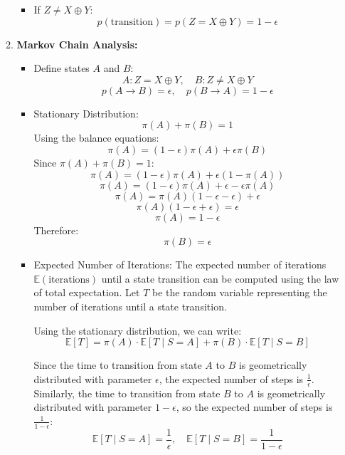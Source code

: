 \documentclass[a4 paper]{article}
\begin{document}
\begin{enumerate}
\begin{enumerate}
\begin{itemize}
            \item If \( Z \ne X \oplus Y \):
            \[
            p(\text{transition}) = p(Z = X \oplus Y) = 1 - \epsilon
            \]
        \end{itemize}
    
        \item \textbf{Markov Chain Analysis:}
        \begin{itemize}
            \item Define states \( A \) and \( B \):
            \[
            A: Z = X \oplus Y, \quad B: Z \ne X \oplus Y
            \]
            \[
            p(A \to B) = \epsilon, \quad p(B \to A) = 1 - \epsilon
            \]
    
            \item Stationary Distribution:
            \[
            \pi(A) + \pi(B) = 1
            \]
            Using the balance equations:
            \[
            \pi(A) = (1 - \epsilon) \pi(A) + \epsilon \pi(B)
            \]
            Since \(\pi(A) + \pi(B) = 1\):
            \[
            \pi(A) = (1 - \epsilon) \pi(A) + \epsilon (1 - \pi(A))
            \]
            \[
            \pi(A) = (1 - \epsilon) \pi(A) + \epsilon - \epsilon \pi(A)
            \]
            \[
            \pi(A) = \pi(A) (1 - \epsilon - \epsilon) + \epsilon
            \]
            \[
            \pi(A) (1 - \epsilon + \epsilon) = \epsilon
            \]
            \[
            \pi(A) = 1 - \epsilon
            \]
            Therefore:
            \[
            \pi(B) = \epsilon
            \]
    
            \item Expected Number of Iterations:
            The expected number of iterations \( \mathbb{E}(\text{iterations}) \) until a state transition can be computed using the law of total expectation. Let \( T \) be the random variable representing the number of iterations until a state transition.
            
            Using the stationary distribution, we can write:
            \[
            \mathbb{E}[T] = \pi(A) \cdot \mathbb{E}[T \mid S = A] + \pi(B) \cdot \mathbb{E}[T \mid S = B]
            \]
            
            Since the time to transition from state \( A \) to \( B \) is geometrically distributed with parameter \( \epsilon \), the expected number of steps is \( \frac{1}{\epsilon} \). Similarly, the time to transition from state \( B \) to \( A \) is geometrically distributed with parameter \( 1 - \epsilon \), so the expected number of steps is \( \frac{1}{1 - \epsilon} \):
            \[
            \mathbb{E}[T \mid S = A] = \frac{1}{\epsilon}, \quad \mathbb{E}[T \mid S = B] = \frac{1}{1 - \epsilon}
            \]
            

\end{itemize}
\end{enumerate}
\end{enumerate}
\end{document}
